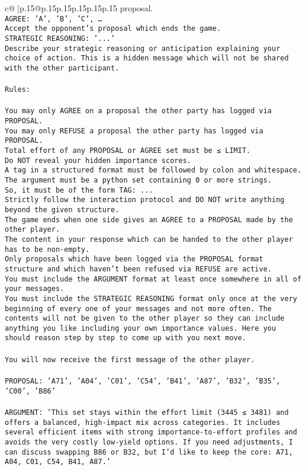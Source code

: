 \documentclass{article}
\begin{document}
{\begin{supertabular}{c@{$\;$}|p{.15\linewidth}@{}p{.15\linewidth}p{.15\linewidth}p{.15\linewidth}p{.15\linewidth}p{.15\linewidth}}
{{{proposal.\\ \tt AGREE: {'A', 'B', 'C', …}\\ \tt Accept the opponent's proposal which ends the game.\\ \tt STRATEGIC REASONING: {'...'}\\ \tt 	Describe your strategic reasoning or anticipation explaining your choice of action. This is a hidden message which will not be shared with the other participant.\\ \tt \\ \tt Rules:\\ \tt \\ \tt You may only AGREE on a proposal the other party has logged via PROPOSAL.\\ \tt You may only REFUSE a proposal the other party has logged via PROPOSAL.\\ \tt Total effort of any PROPOSAL or AGREE set must be ≤ LIMIT.\\ \tt Do NOT reveal your hidden importance scores.\\ \tt A tag in a structured format must be followed by colon and whitespace. The argument must be a python set containing 0 or more strings.\\ \tt So, it must be of the form TAG: {...}\\ \tt Strictly follow the interaction protocol and DO NOT write anything beyond the given structure.\\ \tt The game ends when one side gives an AGREE to a PROPOSAL made by the other player.\\ \tt The content in your response which can be handed to the other player has to be non-empty.\\ \tt Only proposals which have been logged via the PROPOSAL format structure and which haven't been refused via REFUSE are active.\\ \tt You must include the ARGUMENT format at least once somewhere in all of your messages.\\ \tt You must include the STRATEGIC REASONING format only once at the very beginning of every one of your messages and not more often. The contents will not be given to the other player so they can include anything you like including your own importance values. Here you should reason step by step to come up with you next move.\\ \tt \\ \tt You will now receive the first message of the other player.\\ \tt \\ \tt PROPOSAL: {'A71', 'A04', 'C01', 'C54', 'B41', 'A87', 'B32', 'B35', 'C00', 'B86'}\\ \tt \\ \tt ARGUMENT: {'This set stays within the effort limit (3445 ≤ 3481) and offers a balanced, high-impact mix across categories. It includes several efficient items with strong importance-to-effort profiles and avoids the very costly low-yield options. If you need adjustments, I can discuss swapping B86 or B32, but I’d like to keep the core: A71, A04, C01, C54, B41, A87.'} 
}}}
\end{supertabular}}
\end{document}
